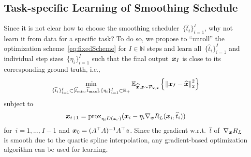 \documentclass{article}
\newcommand{\N}{\mathbb{N}}
\newcommand{\X}{\mathcal{X}}
\newcommand{\norm}[1]{\left\Vert#1\right\Vert}
\newcommand{\prox}{\mathrm{prox}}
\def\hatt{{\widehat{t}}}
\newcommand{\tminh}{\hatt_\mathrm{min}}
\newcommand{\tmaxh}{\hatt_\mathrm{max}}
\newcommand{\dist}[1]{\mathcal{P}_{#1}}
\theoremstyle{plain}
\theoremstyle{definition}
\theoremstyle{remark}
\begin{document}

\subsection{Task-specific Learning of Smoothing Schedule} \label{sec:learnedVN}
Since it is not clear how to choose the smoothing scheduler~$\{\hatt_i\}_{i=1}^I$, why not learn it from data for a specific task?
To do so, we propose to ``unroll'' the optimization scheme~\eqref{eq:fixedScheme} for $I\in\N$ steps and learn all~$\{\hatt_i\}_{i=1}^I$ and individual step sizes~$\{\eta_i\}_{i=1}^I$ such that the final output~${\bm{x}}_I$ is close to its corresponding ground truth, i.e.,
\[
\min_{\{\hatt_i\}_{i=1}^I\subset[\tminh,\tmaxh],\{\eta_i\}_{i=1}^I\subset\R_+} \E_{\widehat{\vx},\vz\sim\dist{\rvx,\rvz}} \left\{\norm{\vx_I-\widehat{\vx}}_2^2\right\}
\]
subject to
\[
\vx_{i+1} = \prox_{\eta_i D(\vz,\cdot)}(\vx_i-\eta_i \nabla_\vx R_L(\vx_i,\hatt_i))
\]
for~$i=1,\ldots,I-1$ and ${\bm{x}}_0=(A^\top A)^{-1}A^\top{\bm{z}}$. 
Since the gradient w.r.t.~$\hatt$ of~$\nabla_{\bm{x}} R_L$ is smooth due to the quartic spline interpolation, any gradient-based optimization algorithm can be used for learning.
\end{document}
